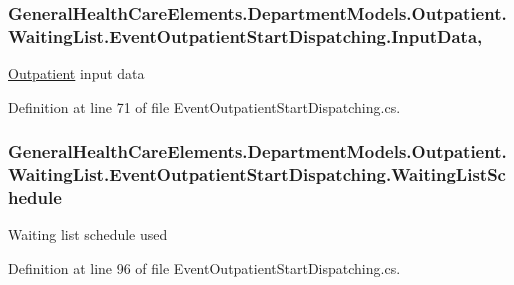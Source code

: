\subsubsection[{\texorpdfstring{Input\+Data}{InputData}}]{ General\+Health\+Care\+Elements.\+Department\+Models.\+Outpatient.\+Waiting\+List.\+Event\+Outpatient\+Start\+Dispatching.\+Input\+Data\hspace{0.3cm}{\ttfamily [get]}, {\ttfamily [set]}}\hypertarget{class_general_health_care_elements_1_1_department_models_1_1_outpatient_1_1_waiting_list_1_1_event_outpatient_start_dispatching_ad40a6501b513b4463eee8d8752cac74b}{}\label{class_general_health_care_elements_1_1_department_models_1_1_outpatient_1_1_waiting_list_1_1_event_outpatient_start_dispatching_ad40a6501b513b4463eee8d8752cac74b}


\hyperlink{namespace_general_health_care_elements_1_1_department_models_1_1_outpatient}{Outpatient} input data 



Definition at line 71 of file Event\+Outpatient\+Start\+Dispatching.\+cs.

\subsubsection[{\texorpdfstring{Waiting\+List\+Schedule}{WaitingListSchedule}}]{ General\+Health\+Care\+Elements.\+Department\+Models.\+Outpatient.\+Waiting\+List.\+Event\+Outpatient\+Start\+Dispatching.\+Waiting\+List\+Schedule\hspace{0.3cm}{\ttfamily [get]}}\hypertarget{class_general_health_care_elements_1_1_department_models_1_1_outpatient_1_1_waiting_list_1_1_event_outpatient_start_dispatching_a0f3082e2e60c9fb4c3a37db2ae7830f8}{}\label{class_general_health_care_elements_1_1_department_models_1_1_outpatient_1_1_waiting_list_1_1_event_outpatient_start_dispatching_a0f3082e2e60c9fb4c3a37db2ae7830f8}


Waiting list schedule used 



Definition at line 96 of file Event\+Outpatient\+Start\+Dispatching.\+cs.

